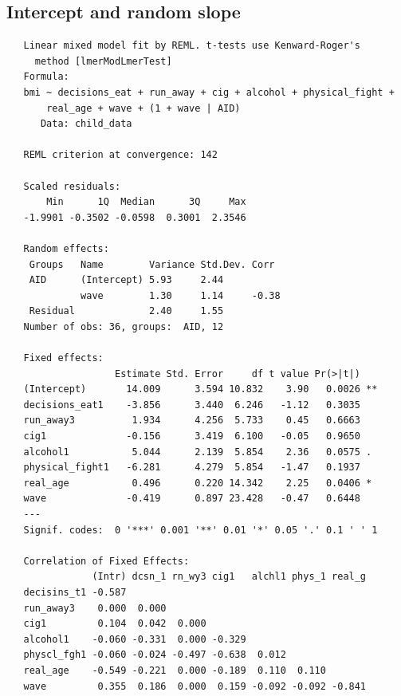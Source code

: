 \documentclass[12pt, twoside]{amherstthesis}
\begin{document}
\hypertarget{intercept-and-random-slope}{%
\subsection{Intercept and random slope}\label{intercept-and-random-slope}}
\begin{verbatim}
   Linear mixed model fit by REML. t-tests use Kenward-Roger's
     method [lmerModLmerTest]
   Formula: 
   bmi ~ decisions_eat + run_away + cig + alcohol + physical_fight +  
       real_age + wave + (1 + wave | AID)
      Data: child_data
   
   REML criterion at convergence: 142
   
   Scaled residuals: 
       Min      1Q  Median      3Q     Max 
   -1.9901 -0.3502 -0.0598  0.3001  2.3546 
   
   Random effects:
    Groups   Name        Variance Std.Dev. Corr 
    AID      (Intercept) 5.93     2.44          
             wave        1.30     1.14     -0.38
    Residual             2.40     1.55          
   Number of obs: 36, groups:  AID, 12
   
   Fixed effects:
                   Estimate Std. Error     df t value Pr(>|t|)   
   (Intercept)       14.009      3.594 10.832    3.90   0.0026 **
   decisions_eat1    -3.856      3.440  6.246   -1.12   0.3035   
   run_away3          1.934      4.256  5.733    0.45   0.6663   
   cig1              -0.156      3.419  6.100   -0.05   0.9650   
   alcohol1           5.044      2.139  5.854    2.36   0.0575 . 
   physical_fight1   -6.281      4.279  5.854   -1.47   0.1937   
   real_age           0.496      0.220 14.342    2.25   0.0406 * 
   wave              -0.419      0.897 23.428   -0.47   0.6448   
   ---
   Signif. codes:  0 '***' 0.001 '**' 0.01 '*' 0.05 '.' 0.1 ' ' 1
   
   Correlation of Fixed Effects:
               (Intr) dcsn_1 rn_wy3 cig1   alchl1 phys_1 real_g
   decisins_t1 -0.587                                          
   run_away3    0.000  0.000                                   
   cig1         0.104  0.042  0.000                            
   alcohol1    -0.060 -0.331  0.000 -0.329                     
   physcl_fgh1 -0.060 -0.024 -0.497 -0.638  0.012              
   real_age    -0.549 -0.221  0.000 -0.189  0.110  0.110       
   wave         0.355  0.186  0.000  0.159 -0.092 -0.092 -0.841
\end{verbatim}
\end{document}
